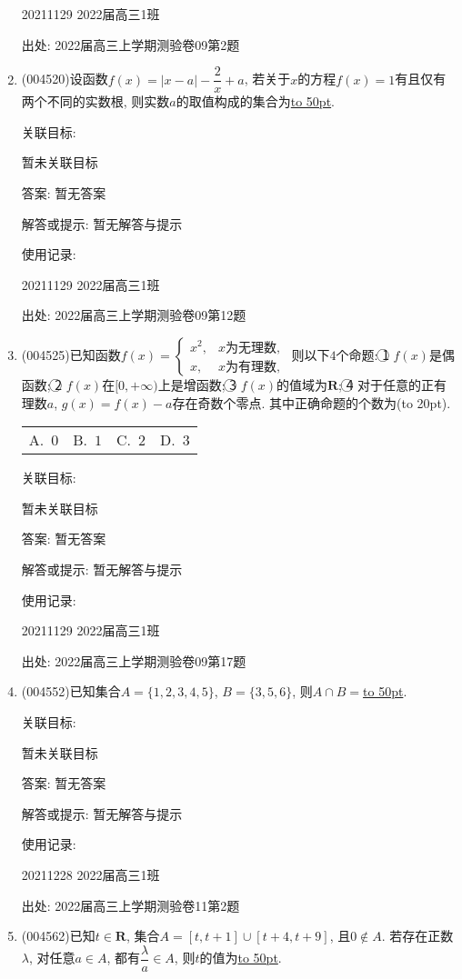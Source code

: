 \documentclass[10pt,a4paper]{article}
\newcommand{\blank}[1]{\underline{\hbox to #1pt{}}}
\newcommand{\bracket}[1]{(\hbox to #1pt{})}
\newcommand{\fourch}[4]{\par\begin{tabular}{p{.23\textwidth}p{.23\textwidth}p{.23\textwidth}p{.23\textwidth}}
A.~#1 &B.~#2& C.~#3& D.~#4
\end{tabular}}
\begin{document}
\begin{enumerate}[1.]
20211129	2022届高三1班	


出处: 2022届高三上学期测验卷09第2题
\item { (004520)}设函数$f(x)=|x-a|-\dfrac 2x+a$, 若关于$x$的方程$f(x)=1$有且仅有两个不同的实数根, 则实数$a$的取值构成的集合为\blank{50}.


关联目标:

暂未关联目标

答案: 暂无答案

解答或提示: 暂无解答与提示

使用记录:

20211129	2022届高三1班	


出处: 2022届高三上学期测验卷09第12题
\item { (004525)}已知函数$f(x)=\begin{cases} x^2, & x\text{为无理数}, \\ x, &x\text{为有理数},   \end{cases}$ 则以下$4$个命题:
\textcircled{1} $f(x)$是偶函数; \textcircled{2} $f(x)$在$[0,+\infty)$上是增函数; \textcircled{3} $f(x)$的值域为$\mathbf{R}$; \textcircled{4} 对于任意的正有理数$a$, $g(x)=f(x)-a$存在奇数个零点.
其中正确命题的个数为\bracket{20}.
\fourch{$0$}{$1$}{$2$}{$3$}


关联目标:

暂未关联目标

答案: 暂无答案

解答或提示: 暂无解答与提示

使用记录:

20211129	2022届高三1班		


出处: 2022届高三上学期测验卷09第17题
\item { (004552)}已知集合$A=\{1,2,3,4,5\}$, $B=\{3,5,6\}$, 则$A\cap B=$\blank{50}.


关联目标:

暂未关联目标

答案: 暂无答案

解答或提示: 暂无解答与提示

使用记录:

20211228	2022届高三1班	


出处: 2022届高三上学期测验卷11第2题
\item { (004562)}已知$t\in \mathbf{R}$, 集合$A=[t,t+1]\cup [t+4,t+9]$, 且$0\not\in A$. 若存在正数$\lambda$, 对任意$a\in A$, 都有$\dfrac{\lambda}a\in A$, 则$t$的值为\blank{50}.



\end{enumerate}
\end{document}

